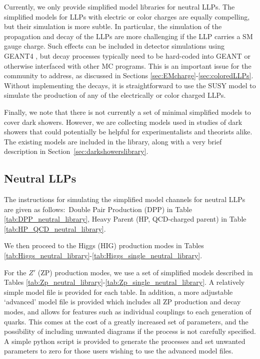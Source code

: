Currently, we only provide simplified model libraries for neutral LLPs. The simplified models for LLPs with electric or color charges are equally compelling, but their simulation is more subtle. In particular, the simulation of the propagation and decay of the LLPs are more challenging if the LLP carries a SM gauge charge. Such effects can be included in detector simulations using GEANT4 \cite{Agostinelli:2002hh}, but decay processes typically need to be hard-coded into GEANT or otherwise interfaced with other MC programs. This is an important issue for the community to address, as discussed in Sections \ref{sec:EMcharge}-\ref{sec:coloredLLPs}. Without implementing the decays, it is straightforward to use the SUSY model to simulate the production of any of the electrically or color charged LLPs.

Finally, we note that there is not currently a set of minimal simplified models to cover dark showers. However, we are collecting models used in studies of dark showers that could potentially be helpful for experimentalists and theorists alike. The existing models are included in the library, along with a very brief description in Section~\ref{sec:darkshowerslibrary}.

\subsection{Neutral LLPs}

The instructions for simulating the simplified model channels for neutral LLPs are given as follows:~Double Pair Production (DPP) in Table \ref{tab:DPP_neutral_library}, Heavy Parent (HP, QCD-charged parent) in Table \ref{tab:HP_QCD_neutral_library}.

 We then proceed to the Higgs (HIG) production modes in Tables \ref{tab:Higgs_neutral_library}-\ref{tab:Higgs_single_neutral_library}.

For the $Z'$ (ZP) production modes, we use a set of simplified models described in Tables \ref{tab:Zp_neutral_library}-\ref{tab:Zp_single_neutral_library}. 
A relatively simple model file is provided for each table. In addition, a more adjustable `advanced' model file is provided which includes all ZP production and decay modes, and allows for features such as individual couplings to each generation of quarks. This comes at the cost of a greatly increased set of parameters, and the possibility of including unwanted diagrams if the process is not carefully specified. A simple python script is provided to generate the processes and set unwanted parameters to zero for those users wishing to use the advanced model files.

